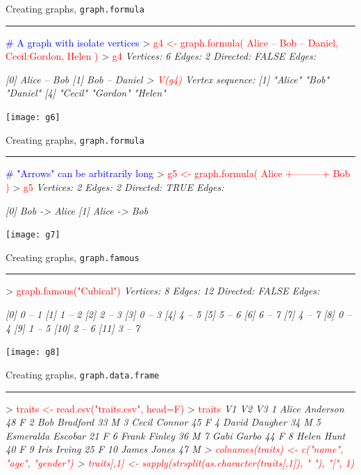 \documentclass[landscape]{foils}
\newcommand{\stitle}[1]{{\centering\color{blue}\Large #1\par\vspace*{10pt}\hrule}}
\newcommand{\command}[1]{\textcolor{red}{#1}}
\newcommand{\comment}[1]{\textcolor{blue}{#1}}
\begin{document}
\newpage
\stitle{Creating graphs, \texttt{graph.formula}}
\begin{Myverb}
\comment{# A graph with isolate vertices}
> \command{g4 <- graph.formula( Alice -- Bob -- Daniel, }
\command{        Cecil:Gordon, Helen )}
> \command{g4}
\slshape Vertices: 6 
\slshape Edges: 2 
\slshape Directed: FALSE 
\slshape Edges:
                    
\slshape [0] Alice  -- Bob   
\slshape [1] Bob    -- Daniel
> \command{V(g4)}
\slshape Vertex sequence:
\slshape [1] "Alice"  "Bob"    "Daniel" 
\slshape [4] "Cecil"  "Gordon" "Helen"
\end{Myverb}
\begin{flushright}
\vspace*{-9.5cm}
\texttt{[image: g6]}
\end{flushright}

\newpage
\stitle{Creating graphs, \texttt{graph.formula}}
\begin{Myverb}
\comment{# "Arrows" can be arbitrarily long}
> \command{g5 <- graph.formula( Alice +---------+ Bob )}
> \command{g5}
\slshape Vertices: 2 
\slshape Edges: 2 
\slshape Directed: TRUE 
\slshape Edges:
                  
\slshape [0] Bob   -> Alice
\slshape [1] Alice -> Bob  
\end{Myverb}
\begin{flushright}
\vspace*{-5.5cm}
\texttt{[image: g7]}
\end{flushright}

\newpage
\stitle{Creating graphs, \texttt{graph.famous}}
\begin{Myverb}
> \command{graph.famous("Cubical")}
\slshape Vertices: 8 
\slshape Edges: 12 
\slshape Directed: FALSE 
\slshape Edges:
           
\slshape [0]  0 -- 1
\slshape [1]  1 -- 2
\slshape [2]  2 -- 3
\slshape [3]  0 -- 3
\slshape [4]  4 -- 5
\slshape [5]  5 -- 6
\slshape [6]  6 -- 7
\slshape [7]  4 -- 7
\slshape [8]  0 -- 4
\slshape [9]  1 -- 5
\slshape [10] 2 -- 6
\slshape [11] 3 -- 7
\end{Myverb}
\begin{flushright}
\vspace*{-11.5cm}
\texttt{[image: g8]}
\end{flushright}

\newpage
\stitle{Creating graphs, \texttt{graph.data.frame}}
\begin{Myverb}
> \command{traits <- read.csv("traits.csv", head=F)}
> \command{traits}
\slshape                   V1 V2 V3
\slshape 1     Alice Anderson 48  F
\slshape 2       Bob Bradford 33  M
\slshape 3       Cecil Connor 45  F
\slshape 4      David Daugher 34  M
\slshape 5  Esmeralda Escobar 21  F
\slshape 6       Frank Finley 36  M
\slshape 7         Gabi Garbo 44  F
\slshape 8         Helen Hunt 40  F
\slshape 9        Iris Irving 25  F
\slshape 10       James Jones 47  M
> \command{colnames(traits) <- c("name", "age", "gender")}
> \command{traits[,1] <- sapply(strsplit(as.character(traits[,1]), " "), "[", 1)}
\end{Myverb}
\end{document}
